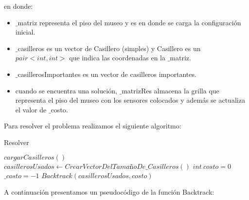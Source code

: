 en donde:

\begin{itemize}
	\item  $\_$matriz representa el piso del museo y es en donde se carga la configuración inicial.
	\item $\_$casilleros es un vector de Casillero (simples) y Casillero es un $pair<int,int>$ que indica las coordenadas en la $\_$matriz.
	\item $\_$casillerosImportantes es un vector de casilleros importantes.
	\item cuando se encuentra una solución, $\_$matrizRes almacena la grilla que representa el piso del museo con los sensores colocados y además se actualiza el valor de $\_$costo. 
\end{itemize}

Para resolver el problema realizamos el siguiente algoritmo:

\begin{algorithm}[H]
\caption{Resolver}\label{Resolver}
\begin{algorithmic}[1]
	\State $cargarCasilleros()$ 
	\State $casillerosUsados\gets CrearVectorDelTamañoDe\_Casilleros()$ 
	\State $int \ costo=0$ 
	\State $\_costo=-1$ 
	\State $Backtrack(casillerosUsados,costo)$
\EndProcedure
\end{algorithmic}
\end{algorithm}

A continuación presentamos un pseudocódigo de la función Backtrack:


